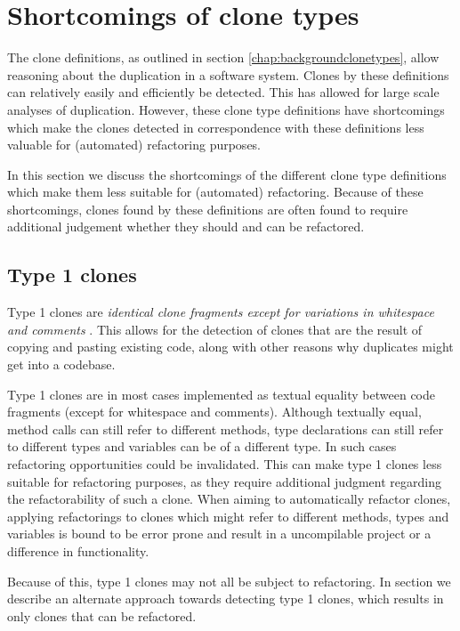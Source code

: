 \documentclass[a4paper]{article}
\begin{document}
\section{Shortcomings of clone types}
The clone definitions, as outlined in section \ref{chap:backgroundclonetypes}, allow reasoning about the duplication in a software system. Clones by these definitions can relatively easily and efficiently be detected. This has allowed for large scale analyses of duplication. However, these clone type definitions have shortcomings which make the clones detected in correspondence with these definitions less valuable for (automated) refactoring purposes.

In this section we discuss the shortcomings of the different clone type definitions which make them less suitable for (automated) refactoring. Because of these shortcomings, clones found by these definitions are often found to require additional judgement whether they should and can be refactored.

\subsection{Type 1 clones} \label{chap:type1clones}
Type 1 clones are \textit{identical clone fragments except for variations in whitespace and comments} \cite{roy2007survey}. This allows for the detection of clones that are the result of copying and pasting existing code, along with other reasons why duplicates might get into a codebase.

Type 1 clones are in most cases implemented as textual equality between code fragments (except for whitespace and comments). Although textually equal, method calls can still refer to different methods, type declarations can still refer to different types and variables can be of a different type. In such cases refactoring opportunities could be invalidated. This can make type 1 clones less suitable for refactoring purposes, as they require additional judgment regarding the refactorability of such a clone. When aiming to automatically refactor clones, applying refactorings to clones which might refer to different methods, types and variables is bound to be error prone and result in a uncompilable project or a difference in functionality.

Because of this, type 1 clones may not all be subject to refactoring. In section \label{chap:type1rclones} we describe an alternate approach towards detecting type 1 clones, which results in only clones that can be refactored.
\end{document}
